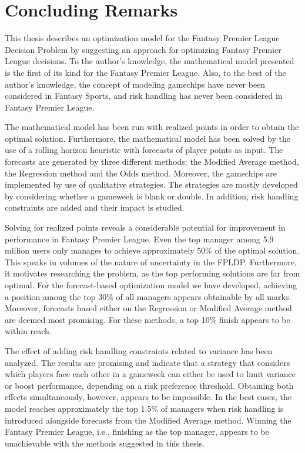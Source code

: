 \chapter{Concluding Remarks}

This thesis describes an optimization model for the Fantasy Premier League Decision Problem by suggesting an approach for optimizing Fantasy Premier League decisions. To the author's knowledge, the mathematical model presented is the first of its kind for the Fantasy Premier League. Also, to the best of the author's knowledge, the concept of modeling gamechips have never been considered in Fantasy Sports, and risk handling has never been considered in Fantasy Premier League.

\newpar

The mathematical model has been run with realized points in order to obtain the optimal solution. Furthermore, the mathematical model has been solved by the use of a rolling horizon heuristic with forecasts of player points as input. The forecasts are generated by three different methods: the Modified Average method, the Regression method and the Odds method. Moreover, the gamechips are implemented by use of qualitative strategies. The strategies are mostly developed by considering whether a gameweek is blank or double. In addition, risk handling constraints are added and their impact is studied.

\newpar

Solving for realized points reveals a considerable potential for improvement in performance in Fantasy Premier League. Even the top manager among 5.9 million users only manages to achieve approximately 50\% of the optimal solution. This speaks in volumes of the nature of uncertainty in the FPLDP. Furthermore, it motivates researching the problem, as the top performing solutions are far from optimal. For the forecast-based optimization model we have developed, achieving a position among the top 30\% of all managers appears obtainable by all marks. Moreover, forecasts based either on the Regression or Modified Average method are deemed most promising. For these methods, a top 10\% finish appears to be within reach.

\newpar

The effect of adding risk handling constraints related to variance has been analyzed. The results are promising and indicate that a strategy that considers which players face each other in a gameweek can either be used to limit variance or boost performance, depending on a risk preference threshold. Obtaining both effects simultaneously, however, appears to be impossible. In the best cases, the model reaches approximately the top 1.5\% of managers when risk handling is introduced alongside forecasts from the Modified Average method. Winning the Fantasy Premier League, i.e., finishing as the top manager, appears to be unachievable with the methods suggested in this thesis.

